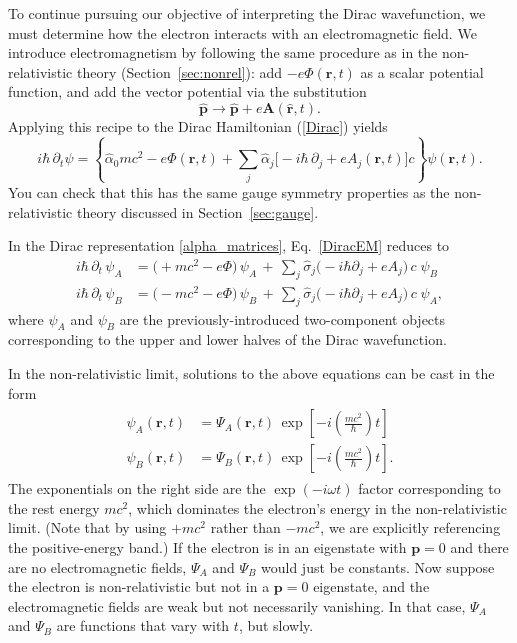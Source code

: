 \documentclass[prx,12pt]{revtex4-2}
\begin{document}
To continue pursuing our objective of interpreting the Dirac
wavefunction, we must determine how the electron interacts with an
electromagnetic field.  We introduce electromagnetism by following the
same procedure as in the non-relativistic theory
(Section~\ref{sec:nonrel}): add $-e\Phi(\mathbf{r},t)$ as a scalar
potential function, and add the vector potential via the substitution
\begin{equation}
  \hat{\mathbf{p}} \rightarrow \hat{\mathbf{p}}
  + e\mathbf{A}(\hat{\mathbf{r}},t).  
\end{equation}
Applying this recipe to the Dirac Hamiltonian (\ref{Dirac}) yields
\begin{equation}
  i\hbar \, \partial_t \psi
  = \left\{\hat{\alpha}_0 mc^2 -e\Phi(\mathbf{r},t)
  + \sum_{j} \hat{\alpha}_j \Big[-i\hbar\,\partial_j
    +eA_j(\mathbf{r},t) \Big] c\right\}\psi(\mathbf{r},t).
  \label{DiracEM}
\end{equation}
You can check that this has the same gauge symmetry properties as the
non-relativistic theory discussed in Section~\ref{sec:gauge}.

In the Dirac representation \eqref{alpha_matrices},
Eq.~\eqref{DiracEM} reduces to
\begin{align}
  i\hbar\, \partial_t \, \psi_A
  &= \big(+mc^2 -e\Phi \big)\,
  \psi_A
  \,+\, \sum_{j} \hat{\sigma}_j \big(-i\hbar\partial_j
    +eA_j \big) \,c\;\psi_B \label{Dirac2a} \\
  i\hbar\, \partial_t \, \psi_B
  &= \big(- mc^2 -e\Phi\big)\,
  \psi_B \,+\, \sum_{j} \hat{\sigma}_j \big(-i\hbar\partial_j
    +eA_j \big)\, c\;\psi_A, \label{Dirac2b}
\end{align}
where $\psi_A$ and $\psi_B$ are the previously-introduced
two-component objects corresponding to the upper and lower halves of
the Dirac wavefunction.

In the non-relativistic limit, solutions to the above equations can be
cast in the form
\begin{align}
  \begin{aligned}
  \psi_{A}(\mathbf{r},t) &= \Psi_{A}(\mathbf{r},t)\,
  \exp\left[-i\left(\frac{mc^2}{\hbar}\right)t\right] \\
  \psi_{B}(\mathbf{r},t) &= \Psi_{B}(\mathbf{r},t)\,
  \exp\left[-i\left(\frac{mc^2}{\hbar}\right)t\right].
  \end{aligned}
\end{align}
The exponentials on the right side are the $\exp(-i\omega t)$ factor
corresponding to the rest energy $mc^2$, which dominates the
electron's energy in the non-relativistic limit.  (Note that by using
$+mc^2$ rather than $-mc^2$, we are explicitly referencing the
positive-energy band.)  If the electron is in an eigenstate with
$\mathbf{p} = 0$ and there are no electromagnetic fields, $\Psi_A$ and
$\Psi_B$ would just be constants.  Now suppose the electron is
non-relativistic but not in a $\mathbf{p} = 0$ eigenstate, and the
electromagnetic fields are weak but not necessarily vanishing.  In
that case, $\Psi_A$ and $\Psi_B$ are functions that vary with $t$, but
slowly.
\end{document}

